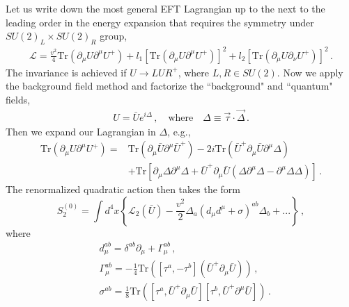 \documentclass[12pt]{article}
\newcommand{\be}{\begin{equation}}
\newcommand{\ee}{\end{equation}}
\newcommand\m{\mu}
\newcommand\n{\nu}
\def\d{\partial}
\begin{document}
Let us write down the most general EFT Lagrangian up to the next to the leading order in the energy expansion that requires the symmetry under $SU(2)_L\times SU(2)_R$ group,
\be
\begin{split}
\mathcal{L}=\frac{v^2}{4}\text{Tr}\left(\d_\m U \d^\m U^+\right)
+l_1[\text{Tr}\left(\d_\m U \d^\m U^+\right)]^2+l_2[\text{Tr}\left(\d_\m U \d_\n U^+\right)]^2\,.
\end{split}
\ee
The invariance is achieved if $U\to L U R^+$, where $L,R\in SU(2)$. Now we apply the background field method and factorize the ``background" and ``quantum" fields,
\be
\begin{split}
U=\bar Ue^{i\Delta}\,,\quad \text{where}\quad \Delta \equiv \vec{\tau}\cdot \vec{\Delta}\,.
\end{split}
\ee
Then we expand our Lagrangian in $\Delta$, e.g.,
\be
\begin{split}
\text{Tr}\left(\d_\m U \d^\m U^+\right)=
&\text{Tr}\left(\d_\m \bar U \d^\m \bar U^+\right)
-2i\text{Tr}\left(\bar U^+\d_\m \bar U \d^\m \Delta \right)\\
&+\text{Tr}\left[\d_\m  \Delta \d^\m \Delta +\bar U^+ \d_\m \bar U(\Delta \d^\m \Delta-\d^\m \Delta \Delta)\right]\,.
\end{split}
\ee
The renormalized quadratic action then takes the form
\be
S_2^{(0)}=\int d^4x \left\{\mathcal{L}_2(\bar U)-\frac{v^2}{2}\Delta_a(d_\m d^\m+\sigma)^{ab}\Delta_b+... \right\}\,,
\ee
where
\be
\begin{split}
& d_\m^{ab}=\delta^{ab} \d_\m+ \Gamma_\m^{ab}\,,\\
& \Gamma_\m^{ab}=-\frac{1}{4}\text{Tr}\left([\tau^a,-\tau^b](\bar U^+\d_\m \bar U)\right)\,,\\
& \sigma^{ab}=\frac{1}{8}\text{Tr}\left([\tau^a,\bar U^+ \d_\m \bar U][\tau^b,\bar U^+ \d^\m \bar U]\right)\,.
\end{split}
\ee
\end{document}
